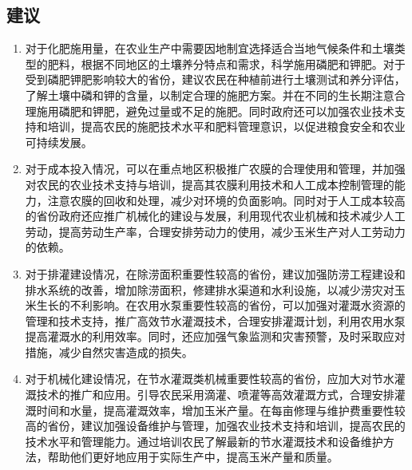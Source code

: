 \subsection{建议}
\begin{enumerate}
  \item 对于化肥施用量，在农业生产中需要因地制宜选择适合当地气候条件和土壤类型的肥料，根据不同地区的土壤养分特点和需求，科学施用磷肥和钾肥。对于受到磷肥钾肥影响较大的省份，建议农民在种植前进行土壤测试和养分评估，了解土壤中磷和钾的含量，以制定合理的施肥方案。并在不同的生长期注意合理施用磷肥和钾肥，避免过量或不足的施肥。同时政府还可以加强农业技术支持和培训，提高农民的施肥技术水平和肥料管理意识，以促进粮食安全和农业可持续发展。
  \item 对于成本投入情况，可以在重点地区积极推广农膜的合理使用和管理，并加强对农民的农业技术支持与培训，提高其农膜利用技术和人工成本控制管理的能力，注意农膜的回收和处理，减少对环境的负面影响。同时对于人工成本较高的省份政府还应推广机械化的建设与发展，利用现代农业机械和技术减少人工劳动，提高劳动生产率，合理安排劳动力的使用，减少玉米生产对人工劳动力的依赖。
  \item 对于排灌建设情况，在除涝面积重要性较高的省份，建议加强防涝工程建设和排水系统的改善，增加除涝面积，修建排水渠道和水利设施，以减少涝灾对玉米生长的不利影响。在农用水泵重要性较高的省份，可以加强对灌溉水资源的管理和技术支持，推广高效节水灌溉技术，合理安排灌溉计划，利用农用水泵提高灌溉水的利用效率。同时，还应加强气象监测和灾害预警，及时采取应对措施，减少自然灾害造成的损失。
  \item 对于机械化建设情况，在节水灌溉类机械重要性较高的省份，应加大对节水灌溉技术的推广和应用。引导农民采用滴灌、喷灌等高效灌溉方式，合理安排灌溉时间和水量，提高灌溉效率，增加玉米产量。在每亩修理与维护费重要性较高的省份，建议加强设备维护与管理，加强农业技术支持和培训，提高农民的技术水平和管理能力。通过培训农民了解最新的节水灌溉技术和设备维护方法，帮助他们更好地应用于实际生产中，提高玉米产量和质量。
\end{enumerate}


